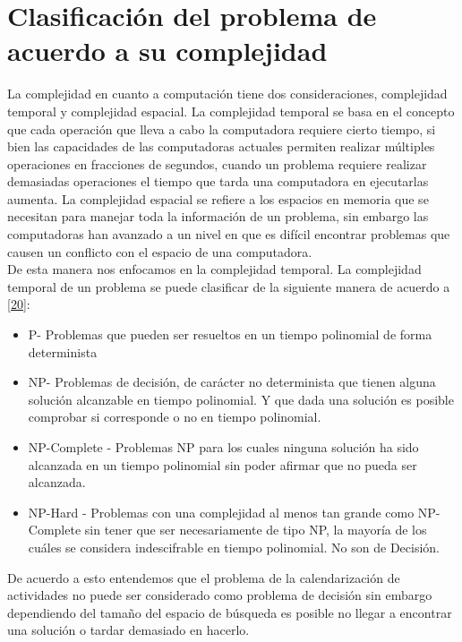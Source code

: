 	\section{Clasificación del problema de acuerdo a su complejidad}
	
	La complejidad en cuanto a computación tiene dos consideraciones, complejidad temporal y complejidad espacial. La complejidad temporal se basa en el concepto que cada operación que lleva a cabo la computadora requiere cierto tiempo, si bien las capacidades de las computadoras actuales permiten realizar múltiples operaciones en fracciones de segundos, cuando un problema requiere realizar demasiadas operaciones el tiempo que tarda una computadora en ejecutarlas aumenta. La complejidad espacial se refiere a los espacios en memoria que se necesitan para manejar toda la información de un problema, sin embargo las computadoras han avanzado a un nivel en que es difícil encontrar problemas que causen un conflicto con el espacio de una computadora.\\
	
	De esta manera nos enfocamos en la complejidad temporal. La complejidad temporal de un problema se puede clasificar de la siguiente manera de acuerdo a \ref{20}: 
	
		\begin{itemize}
			\item P- Problemas que pueden ser resueltos en un tiempo polinomial de forma determinista
			
			\item NP- Problemas de decisión, de carácter no determinista que tienen alguna solución alcanzable en tiempo polinomial. Y que dada una solución es posible comprobar si corresponde o no en tiempo polinomial.
			
			\item NP-Complete - Problemas NP para los cuales ninguna solución ha sido alcanzada en un tiempo polinomial sin poder afirmar que no pueda ser alcanzada.
			
			\item NP-Hard - Problemas con una complejidad al menos tan grande como NP-Complete sin tener que ser necesariamente de tipo NP, la mayoría de los cuáles se considera indescifrable en tiempo polinomial. No son de Decisión. 
			
		\end{itemize}
	De acuerdo a esto entendemos que el problema de la calendarización de actividades no puede ser considerado como problema de decisión sin embargo dependiendo del tamaño del espacio de búsqueda es posible no llegar a encontrar una solución o tardar demasiado en hacerlo.\\
	
